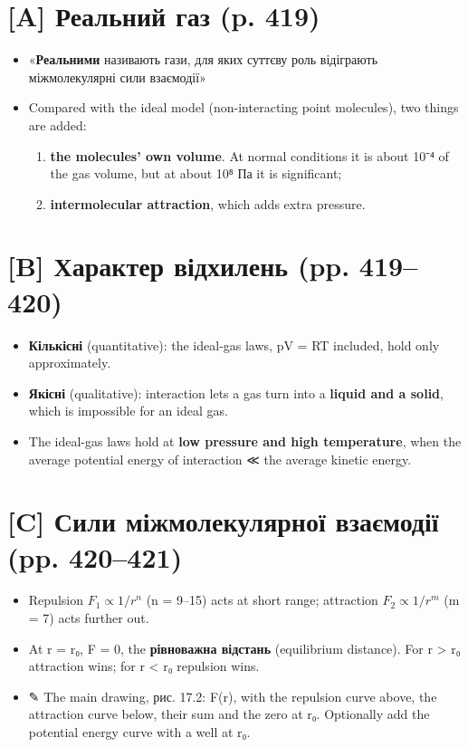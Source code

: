 \documentclass[11pt,a4paper,oneside]{book}
\newcommand{\pen}{{\sffamily\color{accent}✎}}
\begin{document}
\section*{[A] Реальний газ (p. 419)}
\begin{itemize}
\item «\textbf{Реальними} називають гази, для яких суттєву роль відіграють міжмолекулярні сили взаємодії»
\item Compared with the ideal model (non-interacting point molecules), two things are added:
\begin{enumerate}
\item \textbf{the molecules' own volume}. At normal conditions it is about 10⁻⁴ of the gas volume, but at about 10⁸ Па it is significant;
\item \textbf{intermolecular attraction}, which adds extra pressure.
\end{enumerate}
\end{itemize}

\section*{[B] Характер відхилень (pp. 419–420)}
\begin{itemize}
\item \textbf{Кількісні} (quantitative): the ideal-gas laws, pV = RT included, hold only approximately.
\item \textbf{Якісні} (qualitative): interaction lets a gas turn into a \textbf{liquid and a solid}, which is impossible for an ideal gas.
\item The ideal-gas laws hold at \textbf{low pressure and high temperature}, when the average potential energy of interaction ≪ the average kinetic energy.
\end{itemize}

\section*{[C] Сили міжмолекулярної взаємодії (pp. 420–421)}
\begin{itemize}
\item Repulsion $F_1 \propto 1/r^n$ (n = 9–15) acts at short range; attraction $F_2 \propto 1/r^m$ (m = 7) acts further out.
\item At r = r₀, F = 0, the \textbf{рівноважна відстань} (equilibrium distance). For r > r₀ attraction wins; for r < r₀ repulsion wins.
\item \pen{} The main drawing, рис. 17.2: F(r), with the repulsion curve above, the attraction curve below, their sum and the zero at r₀. Optionally add the potential energy curve with a well at r₀.
\end{itemize}
\end{document}
